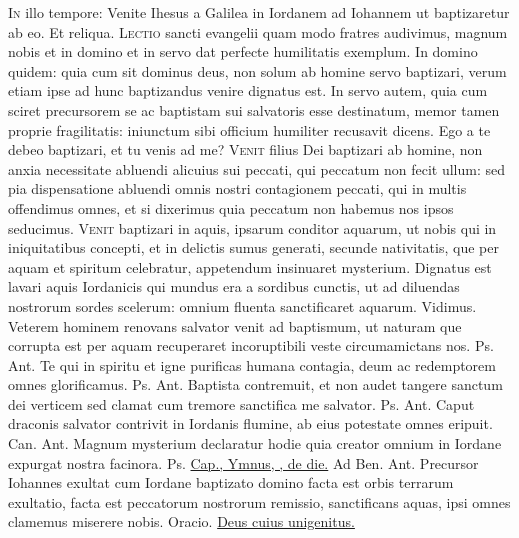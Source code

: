 \begin{multicols*}{2}
\lettrine[lines=2]{\zallmancaps \color{Blue} I}{n} illo tempore: Venite Ihesus a Galilea in Iordanem ad Iohannem ut baptizaretur ab eo. Et reliqua.
 
\lettrine[lines=2]{\zallmancaps \color{Red} L}{ectio} sancti evangelii quam modo fratres audivimus, magnum nobis et in domino et in servo dat perfecte humilitatis exemplum. In domino quidem: quia cum sit dominus deus, non solum ab homine servo baptizari, verum etiam ipse ad hunc baptizandus venire dignatus est. In servo autem, quia cum sciret precursorem se ac baptistam sui salvatoris esse destinatum, memor tamen proprie fragilitatis: iniunctum sibi officium humiliter recusavit dicens. Ego a te debeo baptizari, et tu venis ad me?
\lettrine[lines=2]{\zallmancaps \color{Blue} V}{enit} filius Dei baptizari ab homine, non anxia necessitate abluendi alicuius sui peccati, qui peccatum non fecit ullum: sed pia dispensatione abluendi omnis nostri contagionem peccati, qui in multis offendimus omnes, et si dixerimus quia peccatum non habemus nos ipsos seducimus.
\lettrine[lines=2]{\zallmancaps \color{Red} V}{enit} baptizari in aquis, ipsarum conditor aquarum, ut nobis qui in iniquitatibus concepti, et in delictis sumus generati, secunde nativitatis, que per aquam et spiritum celebratur, appetendum insinuaret mysterium. Dignatus est lavari
aquis Iordanicis qui mundus era a sordibus cunctis, ut ad diluendas nostrorum sordes scelerum: omnium fluenta sanctificaret aquarum.
\V Vidimus.
 Veterem hominem renovans salvator venit ad baptismum, ut naturam que corrupta est per aquam recuperaret incoruptibili veste circumamictans nos. {\color{Red} Ps.}  {\color{Red} Ant.} Te qui in spiritu et igne purificas humana contagia, deum ac redemptorem omnes glorificamus. {\color{Red} Ps.}  {\color{Red} Ant.} Baptista contremuit, et non audet tangere sanctum dei verticem sed clamat cum tremore sanctifica me salvator. {\color{Red} Ps.}  {\color{Red} Ant.} Caput draconis salvator contrivit in Iordanis flumine, ab eius potestate omnes eripuit. {\color{Red} Can.}  {\color{Red} Ant.} Magnum mysterium declaratur hodie quia creator omnium in Iordane expurgat nostra facinora. {\color{Red} Ps.}  \ul{Cap., Ymnus, \Vbar , de die.} {\color{Red} Ad Ben. Ant.} Precursor Iohannes exultat cum Iordane baptizato domino facta est orbis terrarum exultatio, facta est peccatorum nostrorum remissio, sanctificans aquas, ipsi omnes clamemus miserere nobis. {\color{Red} Oracio.} \hyperlink{deus-cuius-unigenitus-epiphanie}{Deus cuius unigenitus.}

\end{multicols*}
